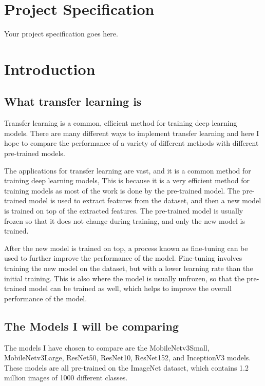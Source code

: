 \documentclass[]{final_report}
\begin{document}
\chapter*{Project Specification}
Your project specification goes here.

\chapter{Introduction}

\section{What transfer learning is}
Transfer learning is a common, efficient method for training deep learning models.
There are many different ways to implement transfer learning and here I hope to compare the performance
of a variety of different methods with different pre-trained models.

The applications for transfer learning are vast, and it is a common method for training deep learning models,
This is because it is a very efficient method for training models as most of the work is done by the pre-trained model.
The pre-trained model is used to extract features from the dataset, and then a new model is trained on top of the extracted features.
The pre-trained model is usually frozen so that it does not change during training, and only the new model is trained.

After the new model is trained on top, a process known as fine-tuning can be used to further improve the performance of the model.
Fine-tuning involves training the new model on the dataset, but with a lower learning rate than the initial training.
This is also where the model is usually unfrozen, so that the pre-trained model can be trained as well, which helps to improve the overall performance of the model.

\section{The Models I will be comparing}
The models I have chosen to compare are the MobileNetv3Small\cite{DBLP:journals/corr/abs-1905-02244}, MobileNetv3Large\cite{DBLP:journals/corr/abs-1905-02244}, ResNet50\cite{DBLP:journals/corr/HeZRS15}, ResNet10\cite{DBLP:journals/corr/HeZRS15}, ResNet152\cite{DBLP:journals/corr/HeZRS15}, and InceptionV3\cite{DBLP:journals/corr/SzegedyVISW15} models.
These models are all pre-trained on the ImageNet dataset, which contains 1.2 million images of 1000 different classes.
\end{document}
